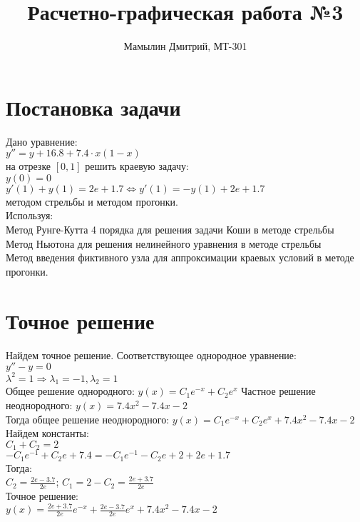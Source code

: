 \documentclass[12pt,a4paper]{article}
\title{Расчетно-графическая работа №3}
\author{Мамылин Дмитрий, МТ-301}
\begin{document}

\maketitle
\thispagestyle{empty}

\newpage
\thispagestyle{empty}

    \section*{Постановка задачи}
        Дано уравнение:\\
        $y'' = y + 16.8 + 7.4 \cdot x(1 - x)$\\
        на отрезке $[0, 1]$ решить краевую задачу:\\
        $y(0) = 0$\\
        $y'(1) + y(1) = 2e + 1.7 \iff y'(1) = -y(1) + 2e + 1.7$\\
        методом стрельбы и методом прогонки.\\
        Используя:\\
        Метод Рунге-Кутта 4 порядка для решения задачи Коши в методе стрельбы\\
        Метод Ньютона для решения нелинейного уравнения в методе стрельбы\\
        Метод введения фиктивного узла для аппроксимации краевых условий в методе прогонки.
        
    \section*{Точное решение}
        Найдем точное решение. Соответствующее однородное уравнение:\\
        $y'' - y = 0$\\
        $\lambda^{2} = 1 \Rightarrow \lambda_{1} = -1, \lambda_{2} = 1$\\
        Общее решение однородного: $y(x) = C_{1}e^{-x} + C_{2}e^{x}$
        Частное решение неоднородного: $y(x) = 7.4x^{2} - 7.4x - 2$\\
        Тогда общее решение неоднородного: $y(x) = C_{1}e^{-x} + C_{2}e^{x} +
        7.4x^{2} - 7.4x - 2$\\
        Найдем константы:\\
        $C_{1} + C_{2} = 2$\\
        $-C_{1}e^{-1} + C_{2}e + 7.4 = -C_{1}e^{-1} - C_{2}e + 2 + 2e + 1.7$\\
        Тогда:\\
        $C_{2} = \frac{2e - 3.7}{2e}$; 
        $C_{1} = 2 - C_{2} = \frac{2e + 3.7}{2e}$\\
        Точное решение:\\
        $y(x) = \frac{2e + 3.7}{2e}e^{-x} + \frac{2e - 3.7}{2e}e^{x} 
        + 7.4x^{2} - 7.4x - 2$
        
\end{document}
